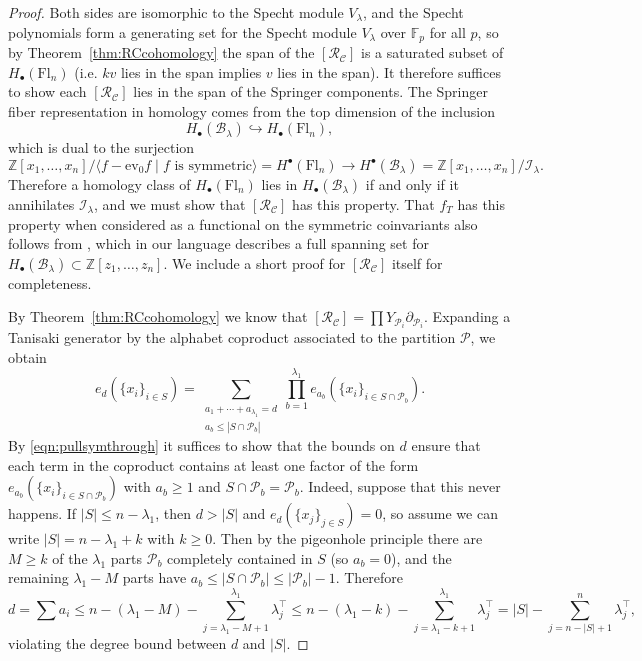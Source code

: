 \documentclass[11pt]{amsart}
\theoremstyle{definition}
\numberwithin{equation}{section}
\newcommand{\suchthat}{\;|\;}
\newcommand{\ct}{\operatorname{ev_0}} %
\newcommand{\fl}[1]{\mathrm{Fl}_{#1}}
\begin{document}
\begin{proof}
Both sides are isomorphic to the Specht module $V_\lambda$, and the Specht polynomials form a generating set for the Specht module $V_\lambda$ over $\mathbb{F}_p$ for all $p$, so by Theorem~\ref{thm:RCcohomology} the span of the $[\mathcal{R}_{\mathcal{C}}]$ is a saturated subset of $H_\bullet(\fl{n})$ (i.e. $kv$ lies in the span implies $v$ lies in the span). It therefore suffices to show each $[\mathcal{R}_{\mathcal{C}}]$ lies in the span of the Springer components. The Springer fiber representation in homology comes from the top dimension of the inclusion
$$H_{\bullet}(\mathcal{B}_\lambda)\hookrightarrow H_\bullet(\fl{n}),$$
which is dual to the surjection
$$\mathbb{Z}[x_1,\ldots,x_n]/\langle f-\ct f\suchthat f\text{ is symmetric}\rangle=H^\bullet(\fl{n})\to H^\bullet(\mathcal{B}_\lambda)=\mathbb{Z}[x_1,\ldots,x_n]/\mathcal{I}_\lambda.$$
Therefore a homology class of $H_\bullet(\fl{n})$ lies in $H_\bullet(\mathcal{B}_\lambda)$ if and only if it annihilates $\mathcal{I}_\lambda$, and we must show that $[\mathcal{R}_{\mathcal{C}}]$ has this property.
That $f_T$ has this property when considered as a functional on the symmetric coinvariants also follows from \cite[Lemma 11]{RYZ20}, which in our language describes a full spanning set for $H_\bullet(\mathcal{B}_\lambda)\subset \mathbb{Z}[z_1,\ldots,z_n]$. We include a short proof for $[\mathcal{R}_{\mathcal{C}}]$ itself for completeness.

By Theorem~\ref{thm:RCcohomology} we know that $[\mathcal{R}_{\mathcal{C}}]=\prod Y_{\mathcal{P}_i}\partial_{\mathcal{P}_i}$. Expanding a Tanisaki generator by the alphabet coproduct associated to the partition $\mathcal{P}$, we obtain
$$e_d(\{x_i\}_{i\in S})=\sum_{\substack{a_1+\cdots+a_{\lambda_1}=d\\a_b\le |S\cap \mathcal{P}_b|}}\prod_{b=1}^{\lambda_1} e_{a_b}(\{x_i\}_{i\in S\cap \mathcal{P}_b}).$$
By \eqref{eqn:pullsymthrough} it suffices to show that the bounds on $d$ ensure that each term in the coproduct contains at least one factor of the form $e_{a_b}(\{x_i\}_{i\in S\cap \mathcal{P}_b})$ with $a_b\ge 1$ and $S\cap \mathcal{P}_b=\mathcal{P}_b$. Indeed, suppose that this never happens. If $|S|\le n-\lambda_1$, then $d>|S|$ and $e_d(\{x_j\}_{j\in S})=0$, so assume we can write $|S|=n-\lambda_1+k$ with $k\ge 0$.
Then by the pigeonhole principle there are $M\ge k$ of the $\lambda_1$ parts $\mathcal{P}_b$ completely contained in $S$ (so $a_b=0$), and the remaining $\lambda_1-M$ parts have $a_b\le |S\cap \mathcal{P}_b|\le |\mathcal{P}_b|-1$.
Therefore $$d=\sum a_i\le n-(\lambda_1-M)-\sum_{j=\lambda_1-M+1}^{\lambda_1}\lambda_j^{\top}\le n-(\lambda_1-k)-\sum_{j=\lambda_1-k+1}^{\lambda_1}\lambda_j^{\top}=|S|-\sum_{j=n-|S|+1}^n\lambda_j^{\top},$$
violating the degree bound between $d$ and $|S|$.
\end{proof}
\end{document}
